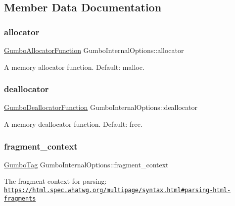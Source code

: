 \subsection{Member Data Documentation}
\mbox{\label{struct_gumbo_internal_options_acac0fe2be11fb72dcdb39d9c417dd31d}} 
\subsubsection{\texorpdfstring{allocator}{allocator}}
{\footnotesize\ttfamily \mbox{\hyperlink{gumbo_8h_aaf78769ab19b5fbe291f7977cae899df}{Gumbo\+Allocator\+Function}} Gumbo\+Internal\+Options\+::allocator}

A memory allocator function. Default\+: malloc. \mbox{\label{struct_gumbo_internal_options_a02f657a8c26adca403786187741ea00c}} 
\subsubsection{\texorpdfstring{deallocator}{deallocator}}
{\footnotesize\ttfamily \mbox{\hyperlink{gumbo_8h_a19e07a5e573bf194295141fba654d2ea}{Gumbo\+Deallocator\+Function}} Gumbo\+Internal\+Options\+::deallocator}

A memory deallocator function. Default\+: free. \mbox{\label{struct_gumbo_internal_options_a7e7e60aee3ec81b2faee2b504a26321f}} 
\subsubsection{\texorpdfstring{fragment\+\_\+context}{fragment\_context}}
{\footnotesize\ttfamily \mbox{\hyperlink{gumbo_8h_a5a3aa6f4b039f85875d638088e676a0f}{Gumbo\+Tag}} Gumbo\+Internal\+Options\+::fragment\+\_\+context}

The fragment context for parsing\+: \href{https://html.spec.whatwg.org/multipage/syntax.html#parsing-html-fragments}{\tt https\+://html.\+spec.\+whatwg.\+org/multipage/syntax.\+html\#parsing-\/html-\/fragments}

